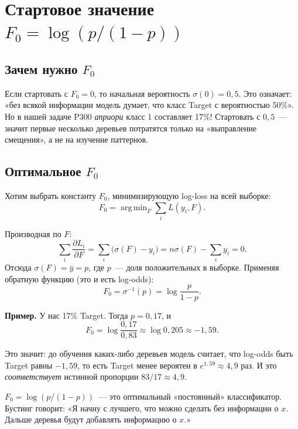 \documentclass[12pt,a4paper]{article}
\newcommand{\argmin}{\operatorname{arg\,min}}
\begin{document}
\section{Стартовое значение $F_0 = \log(p/(1-p))$}

\subsection{Зачем нужно $F_0$}

Если стартовать с $F_0 = 0$, то начальная вероятность $\sigma(0) = 0{,}5$. Это означает: «без всякой информации модель думает, что класс Target с вероятностью 50\%». Но в нашей задаче P300 \emph{априори} класс 1 составляет 17\%! Стартовать с $0{,}5$~--- значит первые несколько деревьев потратятся только на «выправление смещения», а не на изучение паттернов.

\subsection{Оптимальное $F_0$}

Хотим выбрать константу $F_0$, минимизирующую log-loss на всей выборке:
\[
  F_0 = \argmin_F \sum_i L(y_i, F).
\]

\begin{derivation}
Производная по $F$:
\[
  \sum_i \frac{\partial L_i}{\partial F} = \sum_i \bigl(\sigma(F) - y_i\bigr) = n\sigma(F) - \sum_i y_i = 0.
\]
Отсюда $\sigma(F) = \bar{y} = p$, где $p$~--- доля положительных в выборке. Применяя обратную функцию (это и есть log-odds):
\[
  F_0 = \sigma^{-1}(p) = \log \frac{p}{1 - p}.
\]
\end{derivation}

\textbf{Пример.} У нас 17\% Target. Тогда $p = 0{,}17$, и
\[
  F_0 = \log\frac{0{,}17}{0{,}83} \approx \log 0{,}205 \approx -1{,}59.
\]

Это значит: до обучения каких-либо деревьев модель считает, что log-odds быть Target равны $-1{,}59$, то есть Target менее вероятен в $e^{1{,}59} \approx 4{,}9$ раз. И это \emph{соответствует} истинной пропорции $83/17 \approx 4{,}9$.

\begin{intuition}
$F_0 = \log(p/(1-p))$~--- это оптимальный «постоянный» классификатор. Бустинг говорит: «Я начну с лучшего, что можно сделать без информации о $x$. Дальше деревья будут добавлять информацию о $x$.»
\end{intuition}
\end{document}
